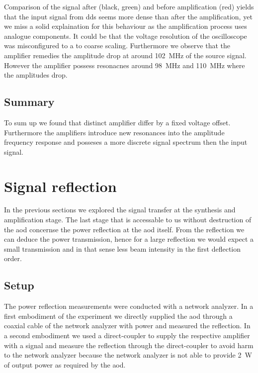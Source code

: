 Comparison of the signal after (black, green) and before amplification (red)
yields that the input signal from \gls{dds} seems more dense than after the
amplification, yet we miss a solid explaination for this behaviour as the
amplification process uses analogue components. It could be that the voltage
resolution of the oscilloscope was misconfigured to a to coarse scaling.
Furthermore we observe that the amplifier remedies the amplitude drop
at around \SI{102}{\mega\hertz} of the source signal. However the amplifier
possess resonacnes around \SI{98}{\mega\hertz} and \SI{110}{\mega\hertz}
where the amplitudes drop.

\subsection{Summary}

To sum up we found that distinct amplifier differ by a fixed voltage offset.
Furthermore the amplifiers introduce new resonances into the amplitude
frequency response and posseses a more discrete signal spectrum then the
input signal.

\section{Signal reflection}

In the previous sections we explored the signal transfer at the synthesis
and amplification stage. The last stage that is accessable to us without
destruction of the \gls{aod} concernse the power reflection at the \gls{aod}
itself. From the reflection we can deduce the power transmission, hence for
a large reflection we would expect a small transmission and in that sense
less beam intensity in the first deflection order.

\subsection{Setup}

The power reflection measurements were conducted with a network analyzer. In
a first embodiment of the experiment we directly supplied the \gls{aod}
through a coaxial cable of the network analyzer with power and measured the
reflection. In a second embodiment we used a direct-coupler to supply the
respective amplifier with a signal and measure the reflection through the
direct-coupler to avoid harm to the network analyzer because the network
analyzer is not able to provide \SI{2}{\watt} of output power as required
by the \gls{aod}.

